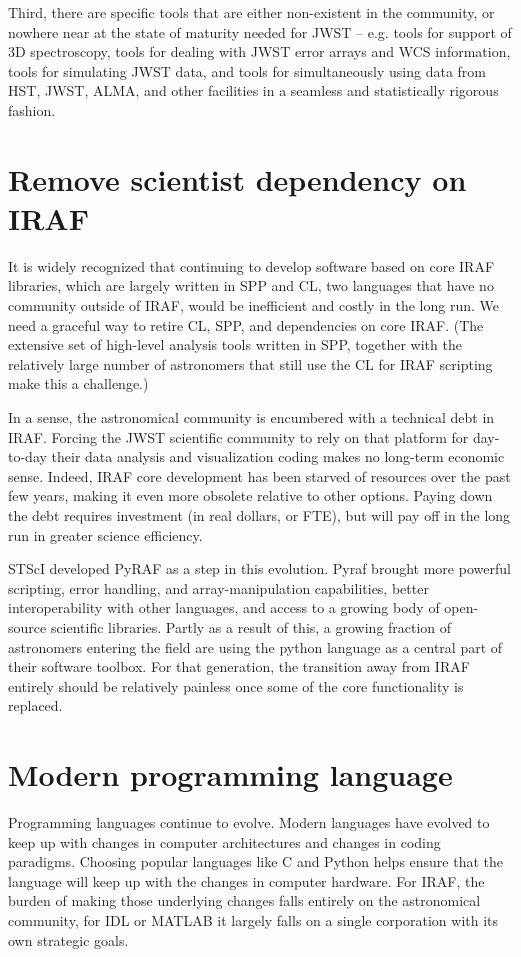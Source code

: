 \documentclass[letterpaper,10pt,english]{sphinxmanual}
\begin{document}
Third, there are specific
tools that are either non-existent in the community, or nowhere near at
the state of maturity needed for JWST --
e.g. tools for support of 3D spectroscopy, tools for dealing with JWST
error arrays and WCS information, tools for simulating JWST data, and
tools for simultaneously using data from HST, JWST, ALMA, and other facilities
in a seamless and statistically rigorous fashion.


\section{Remove scientist dependency on IRAF}
\label{intro:remove-scientist-dependency-on-iraf}
It  is widely recognized that continuing to develop
software based on core IRAF libraries, which are largely written in SPP and CL,
two languages that have no community outside of IRAF, would be inefficient
and costly in the long run. We need a graceful way to retire CL, SPP, and
dependencies on core IRAF.  (The extensive set of high-level analysis tools
written in SPP, together with the relatively large number of astronomers that
still use the CL for IRAF scripting make this a challenge.)

In a sense, the astronomical community is encumbered with a
technical debt in IRAF. Forcing the JWST scientific community to
rely on that platform for day-to-day their data analysis and visualization coding
makes no long-term economic sense.
Indeed, IRAF core development has been starved of resources over the
past few years, making it even more obsolete relative to other
options. Paying down the debt requires investment (in real dollars, or
FTE), but will pay off in the long run in greater science efficiency.

STScI developed PyRAF as a step in this evolution. Pyraf brought more powerful
scripting, error handling, and array-manipulation capabilities, better interoperability
with other languages, and access to a growing body of open-source scientific libraries.
Partly as a result of this, a growing fraction of astronomers entering the field
are using the python language as a central part of their software toolbox. For
that generation, the transition away from IRAF entirely should be relatively
painless once some of the core functionality is replaced.


\section{Modern programming language}
\label{intro:modern-programming-language}
Programming languages continue to evolve. Modern languages have
evolved to keep up with changes in computer architectures and changes
in coding paradigms. Choosing popular languages like C and Python helps
ensure that the language will keep up with the changes in computer
hardware. For IRAF, the burden of making those underlying changes falls
entirely on the astronomical community, for IDL or MATLAB it largely falls on a
single corporation with its own strategic goals.
\end{document}
